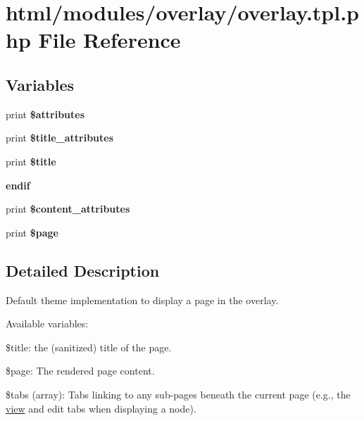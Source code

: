 \hypertarget{overlay_8tpl_8php}{
\section{html/modules/overlay/overlay.tpl.php File Reference}
\label{overlay_8tpl_8php}
}
\subsection*{Variables}
\begin{DoxyCompactItemize}
\item 
\hypertarget{overlay_8tpl_8php_a9c88c4272fa40546577b45392a0b3cd3}{
print {\bfseries \$attributes}}
\label{overlay_8tpl_8php_a9c88c4272fa40546577b45392a0b3cd3}

\item 
\hypertarget{overlay_8tpl_8php_a938746e3da4238c45247505b2d7bd89f}{
print {\bfseries \$title\_\-attributes}}
\label{overlay_8tpl_8php_a938746e3da4238c45247505b2d7bd89f}

\item 
\hypertarget{overlay_8tpl_8php_aec2795512d255332f57cacd930a090b4}{
print {\bfseries \$title}}
\label{overlay_8tpl_8php_aec2795512d255332f57cacd930a090b4}

\item 
\hypertarget{overlay_8tpl_8php_a82cd33ca97ff99f2fcc5e9c81d65251b}{
{\bfseries endif}}
\label{overlay_8tpl_8php_a82cd33ca97ff99f2fcc5e9c81d65251b}

\item 
\hypertarget{overlay_8tpl_8php_ae2ee2e16f11937564281332a76a658e8}{
print {\bfseries \$content\_\-attributes}}
\label{overlay_8tpl_8php_ae2ee2e16f11937564281332a76a658e8}

\item 
\hypertarget{overlay_8tpl_8php_aa0fd4542b316ecf8a64050c479b7227c}{
print {\bfseries \$page}}
\label{overlay_8tpl_8php_aa0fd4542b316ecf8a64050c479b7227c}

\end{DoxyCompactItemize}


\subsection{Detailed Description}
Default theme implementation to display a page in the overlay.

Available variables:
\begin{DoxyItemize}
\item \$title: the (sanitized) title of the page.
\item \$page: The rendered page content.
\item \$tabs (array): Tabs linking to any sub-\/pages beneath the current page (e.g., the \hyperlink{classview}{view} and edit tabs when displaying a node).
\end{DoxyItemize}

